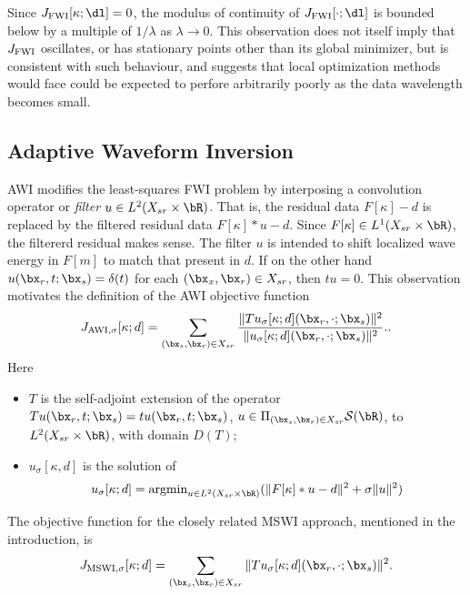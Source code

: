 Since $ J_{\rm FWI}[\kappa;\dl]=0$, the modulus of continuity of
$J_{\rm FWI}[\cdot;\dl]$ is bounded below by a multiple of $1/\lambda$
as $\lambda \rightarrow 0$. This observation does not itself
imply that $ J_{\rm FWI}$ oscillates, or has stationary points other
than its global minimizer, but is consistent with such behaviour, and
suggests that local optimization methods would face could be expected
to perfore arbitrarily poorly as the data wavelength becomes small.

\subsection{Adaptive Waveform Inversion}

AWI modifies the least-squares FWI problem by interposing a convolution operator or
{\em filter} $u \in L^2(X_{sr} \times \bR)$. That is, the residual
data $F[\kappa]-d$ is replaced by the filtered residual data $F[\kappa]*u-d$.
Since $F[\kappa] \in L^1(X_{sr}\times \bR)$, the filtererd residual
makes sense.
The filter $u$ is intended to shift localized wave energy in $F[m]$ to
match that present in $d$. If on the other hand $u(\bx_r,t;\bx_s) =
\delta(t)$ for each $(\bx_x,\bx_r) \in X_{sr}$, then $tu = 0$. This
observation motivates the definition of the AWI objective function
\begin{equation}
  \label{eqn:awidefmain}
  J_{\rm AWI,\sigma}[\kappa;d] = \sum_{(\bx_s,\bx_r) \in X_{sr}}
  \frac{\|Tu_{\sigma}[\kappa;d](\bx_r,\cdot;\bx_s)\|^2}{\|u_{\sigma}[\kappa;d](\bx_r,\cdot;\bx_s)\|^2}..
\end{equation}
Here
\begin{itemize}
  \item[i. ]$T$ is the self-adjoint extension of the operator
$Tu(\bx_r,t;\bx_s) = tu(\bx_r,t;\bx_s)$, $u \in \Pi_{(\bx_s,\bx_r) \in
  X_{sr}}{\cal S}(\bR)$, to $L^2(X_{sr} \times \bR)$, with domain
$D(T)$;
\item[ii. ] $u_{\sigma}[\kappa,d]$ is the solution of
\begin{equation}
  \label{eqn:reg}
  u_{\sigma}[\kappa;d] = \mbox{argmin}_{u \in L^2(X_{sr} \times \bR)} (\|F[\kappa]*u-d\|^2 + \sigma\|u\|^2)
\end{equation}
\end{itemize}

The objective function for the closely related MSWI approach,
mentioned in the introduction, is  
\begin{equation}
  \label{eqn:mswidefmain}
  J_{\rm MSWI,\sigma}[\kappa;d] = \sum_{(\bx_s,\bx_r) \in X_{sr}}
  \|Tu_{\sigma}[\kappa;d](\bx_r,\cdot;\bx_s)\|^2.
\end{equation}

